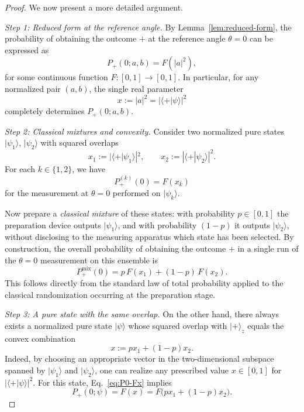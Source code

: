\documentclass[11pt,a4paper]{article}
\numberwithin{equation}{section}
\theoremstyle{definition}
\begin{document}
\begin{proof}
We now present a more detailed argument.

\medskip\noindent
\emph{Step 1: Reduced form at the reference angle.}
By Lemma~\ref{lem:reduced-form}, the probability of obtaining the outcome $+$ at the reference angle $\theta=0$ can be expressed as
\begin{equation}
\label{eq:P0-Fx}
P_+(0;a,b) = F(|a|^2),
\end{equation}
for some continuous function $F:[0,1]\to[0,1]$. In particular, for any normalized pair $(a,b)$, the single real parameter
\[
x := |a|^2 = |\langle +|\psi\rangle|^2
\]
completely determines $P_+(0;a,b)$.

\medskip\noindent
\emph{Step 2: Classical mixtures and convexity.}
Consider two normalized pure states $|\psi_1\rangle$, $|\psi_2\rangle$
with squared overlaps
\[
x_1 := |\langle +|\psi_1\rangle|^2,\qquad
x_2 := |\langle +|\psi_2\rangle|^2.
\]
For each $k\in\{1,2\}$, we have
\[
P_+^{(k)}(0) = F(x_k)
\]
for the measurement at $\theta=0$ performed on $|\psi_k\rangle$.

Now prepare a \emph{classical mixture} of these states: with probability $p\in[0,1]$ the preparation device outputs $|\psi_1\rangle$, and with probability $(1-p)$ it outputs $|\psi_2\rangle$, without disclosing to the measuring apparatus which state has been selected. By construction, the overall probability of obtaining the outcome $+$ in a single run of the
$\theta=0$ measurement on this ensemble is
\begin{equation}
\label{eq:mixture-prob}
P_+^{\mathrm{mix}}(0) = p\,F(x_1) + (1-p)\,F(x_2).
\end{equation}
This follows directly from the standard law of total probability applied to the
classical randomization occurring at the preparation stage.

\medskip\noindent
\emph{Step 3: A pure state with the same overlap.}
On the other hand, there always exists a normalized pure state
$|\psi\rangle$ whose squared overlap with $|+\rangle_z$ equals the convex
combination
\[
x := p x_1 + (1-p)x_2.
\]
Indeed, by choosing an appropriate vector in the two-dimensional subspace spanned by $|\psi_1\rangle$ and $|\psi_2\rangle$, one can realize any prescribed value $x\in[0,1]$ for $|\langle +|\psi\rangle|^2$.
For this state, Eq.~\eqref{eq:P0-Fx} implies
\begin{equation}
\label{eq:pure-prob}
P_+(0;\psi) = F(x) = F\bigl(p x_1 + (1-p)x_2\bigr).
\end{equation}


\end{proof}
\end{document}
